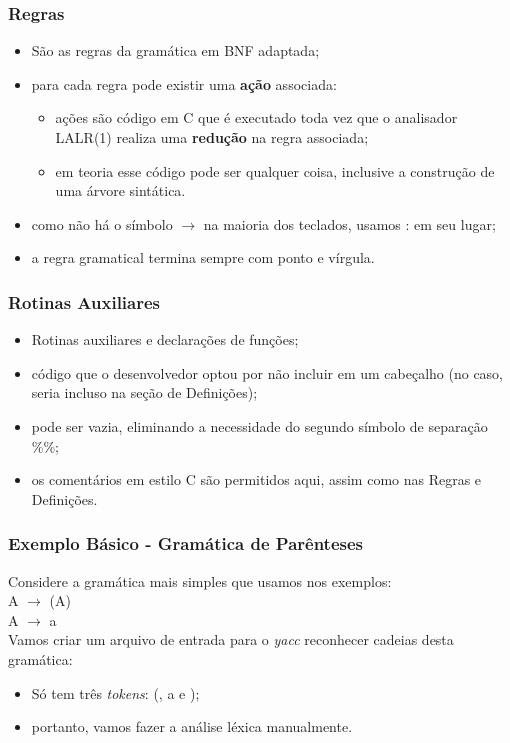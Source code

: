 \documentclass[table]{beamer}
\begin{document}
\begin{frame}
   \frametitle{Regras}
   \begin{itemize}
      \item São as regras da gramática em BNF adaptada;
      \item para cada regra pode existir uma \textbf{ação} associada:
      \begin{itemize}
         \item ações são código em C que é executado toda vez que o analisador LALR(1) realiza uma \textbf{redução} na regra associada;
         \item em teoria esse código pode ser qualquer coisa, inclusive a construção de uma árvore sintática.
      \end{itemize}
      \item como não há o símbolo $\rightarrow$ na maioria dos teclados, usamos : em seu lugar;
      \item a regra gramatical termina sempre com ponto e vírgula. 
   \end{itemize}
\end{frame}

\begin{frame}
   \frametitle{Rotinas Auxiliares}
   \begin{itemize}
      \item Rotinas auxiliares e declarações de funções;
      \item código que o desenvolvedor optou por não incluir em um cabeçalho (no caso, seria incluso na seção de Definições);
      \item pode ser vazia, eliminando a necessidade do segundo símbolo de separação \%\%;
      \item os comentários em estilo C são permitidos aqui, assim como nas Regras e Definições.
   \end{itemize}
\end{frame}

\begin{frame}
   \frametitle{Exemplo Básico - Gramática de Parênteses}
   Considere a gramática mais simples que usamos nos exemplos: \\
   A $\rightarrow$ (A) \\
   A $\rightarrow$ a\\
   Vamos criar um arquivo de entrada para o \textit{yacc} reconhecer cadeias desta gramática: \\
   \begin{itemize}
      \item Só tem três \textit{tokens}: (, a e );
      \item portanto, vamos fazer a análise léxica manualmente.
   \end{itemize}
\end{frame}
\end{document}
